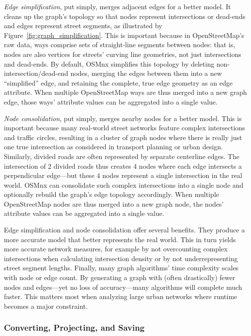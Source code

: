 \documentclass[12pt,letterpaper]{article} %
\begin{document}
\textit{Edge simplification}, put simply, merges adjacent edges for a better model. It cleans up the graph's topology so that nodes represent intersections or dead-ends and edges represent street segments, as illustrated by Figure~\ref{fig:graph_simplification}. This is important because in OpenStreetMap's raw data, ways comprise sets of straight-line segments between nodes: that is, nodes are also vertices for streets' curving line geometries, not just intersections and dead-ends. By default, OSMnx simplifies this topology by deleting non-intersection/dead-end nodes, merging the edges between them into a new \enquote{simplified} edge, and retaining the complete, true edge geometry as an edge attribute. When multiple OpenStreetMap ways are thus merged into a new graph edge, those ways' attribute values can be aggregated into a single value.

\textit{Node consolidation}, put simply, merges nearby nodes for a better model. This is important because many real-world street networks feature complex intersections and traffic circles, resulting in a cluster of graph nodes where there is really just one true intersection as considered in transport planning or urban design. Similarly, divided roads are often represented by separate centerline edges. The intersection of 2 divided roads thus creates 4 nodes where each edge intersects a perpendicular edge---but these 4 nodes represent a single intersection in the real world. OSMnx can consolidate such complex intersections into a single node and optionally rebuild the graph's edge topology accordingly. When multiple OpenStreetMap nodes are thus merged into a new graph node, the nodes' attribute values can be aggregated into a single value.

Edge simplification and node consolidation offer several benefits. They produce a more accurate model that better represents the real world. This in turn yields more accurate network measures, for example by not overcounting complex intersections when calculating intersection density or by not underrepresenting street segment lengths. Finally, many graph algorithms' time complexity scales with node or edge count. By generating a graph with (often drastically) fewer nodes and edges---yet no loss of accuracy---many algorithms will complete much faster. This matters most when analyzing large urban networks where runtime becomes a major constraint.

\subsubsection{Converting, Projecting, and Saving}
\end{document}
